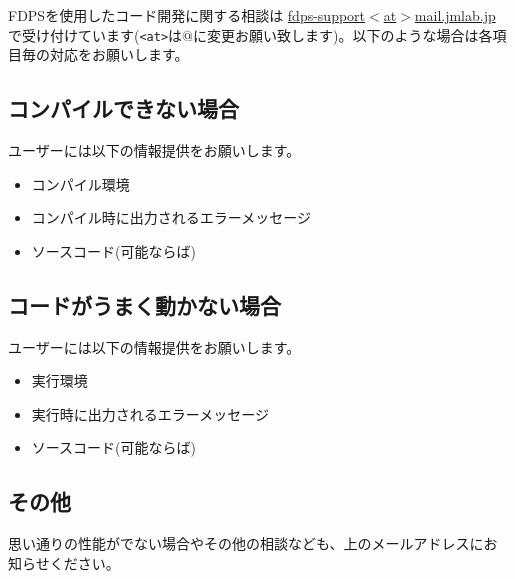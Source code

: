 FDPSを使用したコード開発に関する相談は \href{mailto:fdps-support@mail.jmlab.jp}{fdps-support$<$at$>$mail.jmlab.jp} で受け付けています(\texttt{<at>}は@に変更お願い致します)。以下のような場合は各項目毎の対応をお願いします。

\subsection{コンパイルできない場合}

ユーザーには以下の情報提供をお願いします。
\begin{itemize}
\item コンパイル環境
\item コンパイル時に出力されるエラーメッセージ
\item ソースコード(可能ならば)
\end{itemize}

\subsection{コードがうまく動かない場合}

ユーザーには以下の情報提供をお願いします。
\begin{itemize}
\item 実行環境
\item 実行時に出力されるエラーメッセージ
\item ソースコード(可能ならば)
\end{itemize}

\subsection{その他}

思い通りの性能がでない場合やその他の相談なども、上のメールアドレスにお
知らせください。

